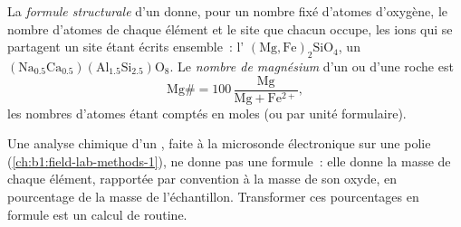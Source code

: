 \begin{definition}\label{def:b1:rock-forming-minerals:formula}
La \emph{formule structurale} d'un  donne,
pour un nombre fixé d'atomes d'oxygène, le nombre d'atomes de chaque élément et
le site que chacun occupe, les ions qui se partagent un site étant écrits
ensemble~: l'
$\mathrm{(Mg, Fe)_2SiO_4}$, un 
$\mathrm{(Na_{0.5}Ca_{0.5})(Al_{1.5}Si_{2.5})O_8}$. Le \emph{nombre de
magnésium} d'un  ou d'une roche est
\[
  \mathrm{Mg\#} = 100\,\frac{\mathrm{Mg}}{\mathrm{Mg} + \mathrm{Fe^{2+}}},
\]
les nombres d'atomes étant comptés en moles (ou par unité formulaire).
\end{definition}

Une analyse chimique d'un , faite à la microsonde électronique sur une
 polie (\cref{ch:b1:field-lab-methods-1}), ne donne pas une formule~:
elle donne la masse de chaque élément, rapportée par convention à la masse de son
oxyde, en pourcentage de la masse de l'échantillon. Transformer ces pourcentages
en formule est un calcul de routine.

